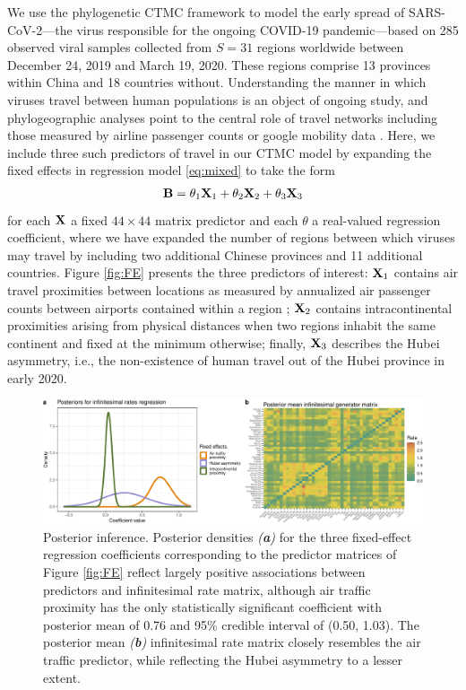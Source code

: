 \documentclass[12pt]{article} %
\begin{document}
We use the phylogenetic CTMC framework to model the early spread of SARS-CoV-2---the virus responsible for the ongoing COVID-19 pandemic---based on 285 observed viral samples collected from $S=31$ regions worldwide between December 24, 2019 and March 19, 2020. These regions comprise 13 provinces within China and 18 countries without.  Understanding the manner in which viruses travel between human populations is an object of ongoing study, and phylogeographic analyses point to the central role of travel networks including those measured by airline passenger counts \citep{holbrook2021massive} or google mobility data \citep{worobey2020emergence}.  Here, we include three such predictors of travel in our CTMC model by expanding the fixed effects in regression model \eqref{eq:mixed} to take the form
\begin{align}\label{eq:linear}
	\mathbf{B} = \theta_1 \mathbf{X}_1 + \theta_2  \mathbf{X}_2 + \theta_3 \mathbf{X}_3 
\end{align} 
for each $\mathbf{X}$ a fixed $44\times 44$ matrix predictor and each $\theta$ a real-valued regression coefficient, where we have expanded the number of regions between which viruses may travel by including two additional Chinese provinces and 11 additional countries.  Figure \ref{fig:FE} presents the three predictors of interest: $\mathbf{X}_1$ contains air travel proximities between locations as measured by annualized air passenger counts between airports contained within a region \citep{holbrook2021massive};  $\mathbf{X}_2$ contains intracontinental proximities arising from physical distances when two regions inhabit the same continent and fixed at the minimum otherwise; finally, $\mathbf{X}_3$ describes the Hubei asymmetry, i.e., the non-existence of human travel out of the Hubei province in early 2020.

\begin{figure}[!t]
	\centering
	\includegraphics[width=\linewidth]{postViz.pdf}
	\vspace{-2em}
	\caption{Posterior inference. Posterior densities \emph{(\textbf{a})} for the three fixed-effect regression coefficients corresponding to the predictor matrices of Figure \ref{fig:FE} reflect largely positive associations between predictors and infinitesimal rate matrix, although air traffic proximity has the only statistically significant coefficient with posterior mean of 0.76 and 95\% credible interval of (0.50, 1.03).  The posterior mean \emph{(\textbf{b})} infinitesimal rate matrix closely resembles the air traffic predictor, while reflecting the Hubei asymmetry to a lesser extent.}\label{fig:post}
\end{figure}
\end{document}

